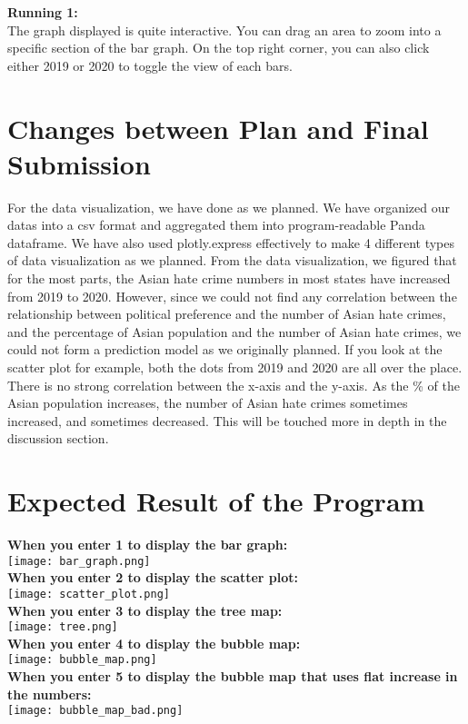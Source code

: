 \documentclass[fontsize=11pt]{article}
\begin{document}
\textbf{Running 1: }\\
The graph displayed is quite interactive. You can drag an area to zoom into a specific section of the bar graph. On the top right corner, you can also click either 2019 or 2020 to toggle the view of each bars.
\section*{Changes between Plan and Final Submission}

For the data visualization, we have done as we planned. We have organized our datas into a csv format and aggregated them into program-readable Panda dataframe. We have also used plotly.express effectively to make 4 different types of data visualization as we planned. From the data visualization, we figured that for the most parts, the Asian hate crime numbers in most states have increased from 2019 to 2020. However, since we could not find any correlation between the relationship between political preference and the number of Asian hate crimes, and the percentage of Asian population and the number of Asian hate crimes, we could not form a prediction model as we originally planned. If you look at the scatter plot for example, both the dots from 2019 and 2020 are all over the place. There is no strong correlation between the x-axis and the y-axis. As the \% of the Asian population increases, the number of Asian hate crimes sometimes increased, and sometimes decreased. This will be touched more in depth in the discussion section.

\section*{Expected Result of the Program}

\textbf{When you enter 1 to display the bar graph: }\\
\texttt{[image: bar\_graph.png]}\\
\textbf{When you enter 2 to display the scatter plot: }\\
\texttt{[image: scatter\_plot.png]}\\
\textbf{When you enter 3 to display the tree map: }\\
\texttt{[image: tree.png]}\\
\textbf{When you enter 4 to display the bubble map: }\\
\texttt{[image: bubble\_map.png]}\\
\textbf{When you enter 5 to display the bubble map that uses flat increase in the numbers: }\\
\texttt{[image: bubble\_map\_bad.png]}
\end{document}
